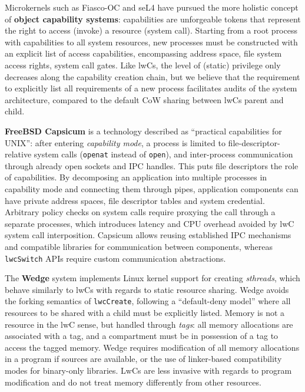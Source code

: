 \documentclass[10pt,twocolumn,a4paper]{article}
\begin{document}
Microkernels such as Fiasco-OC and seL4 have pursued the more holistic concept of \textbf{object capability systems}:
capabilities are unforgeable tokens that represent the right to access (invoke) a resource (system call).
Starting from a root process with capabilities to all system resources, new processes must be constructed with an explicit list of access capabilities, encompassing address space, file system access rights, system call gates.
Like lwCs, the level of (static) privilege only decreases along the capability creation chain, but we believe that the requirement to explicitly list all requirements of a new process facilitates audits of the system architecture, compared to the default CoW sharing between lwCs parent and child.
\cite{elphinstone2013l3}

\textbf{FreeBSD Capsicum} is a technology described as \enquote{practical capabilities for UNIX}:
after entering \textit{capability mode}, a process is limited to file-descriptor-relative system calls (\lstinline{openat} instead of \lstinline{open}), and inter-process communication through already open sockets and IPC handles.
This puts file descriptors the role of capabilities.
By decomposing an application into multiple processes in capability mode and connecting them through pipes, application components can have private address spaces, file descriptor tables and system credential.
Arbitrary policy checks on system calls require proxying the call through a separate processes, which introduces latency and CPU overhead avoided by lwC system call interposition.
Capsicum allows reusing established IPC mechanisms and compatible libraries for communication between components, whereas \lstinline{lwcSwitch} APIs require custom communication abstractions.
\cite{watson2010capsicum}


The \textbf{Wedge} system implements Linux kernel support for creating \textit{sthreads}, which behave similarly to lwCs with regards to static resource sharing.
Wedge avoids the forking semantics of \lstinline{lwcCreate}, following a \enquote{default-deny model} where all resources to be shared with a child must be explicitly listed.
Memory is not a resource in the lwC sense, but handled through \textit{tags}: all memory allocations are associated with a tag, and a compartment must be in possession of a tag to access the tagged memory.
Wedge requires modification of all memory allocations in a program if sources are available, or the use of linker-based compatibility modes for binary-only libraries.
LwCs are less invasive with regards to program modification and do not treat memory differently from other resources.
\cite{bittau2008wedge}
\end{document}
